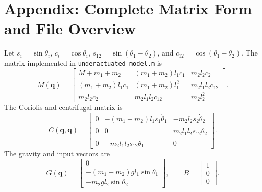 \documentclass[11pt,a4paper]{article}
\begin{document}
\clearpage
\appendix
{}
\section{Appendix: Complete Matrix Form and File Overview}

Let $s_i=\sin\theta_i$, $c_i=\cos\theta_i$, $s_{12}=\sin(\theta_1-\theta_2)$, and $c_{12}=\cos(\theta_1-\theta_2)$. The matrix implemented in \texttt{underactuated\_model.m} is
\begin{equation}
M(\bm q)=
\begin{bmatrix}
M+m_1+m_2 & (m_1+m_2)l_1c_1 & m_2l_2c_2\\
(m_1+m_2)l_1c_1 & (m_1+m_2)l_1^2 & m_2l_1l_2c_{12}\\
m_2l_2c_2 & m_2l_1l_2c_{12} & m_2l_2^2
\end{bmatrix}.
\end{equation}
The Coriolis and centrifugal matrix is
\begin{equation}
C(\bm q,\dot{\bm q})=
\begin{bmatrix}
0 & -(m_1+m_2)l_1s_1\dot{\theta}_1 & -m_2l_2s_2\dot{\theta}_2\\
0 & 0 & m_2l_1l_2s_{12}\dot{\theta}_2\\
0 & -m_2l_1l_2s_{12}\dot{\theta}_1 & 0
\end{bmatrix}.
\end{equation}
The gravity and input vectors are
\begin{equation}
G(\bm q)=
\begin{bmatrix}
0\\
-(m_1+m_2)gl_1\sin\theta_1\\
-m_2gl_2\sin\theta_2
\end{bmatrix},
\qquad
B=
\begin{bmatrix}
1\\0\\0
\end{bmatrix}.
\end{equation}
\end{document}
